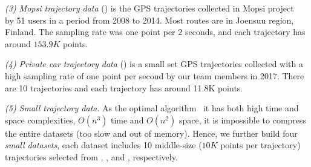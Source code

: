 \vspace{0.5ex}
\ni \emph{(3) Mopsi trajectory data} (\mopsi) is the GPS trajectories collected in Mopsi project~\cite{Mopsi} by 51 users in a period from 2008 to 2014. Most routes are in Joensuu region, Finland.
The sampling rate was one point per $2$ seconds, and each trajectory has around $153.9K$ points.

\vspace{0.5ex}
\ni \emph{(4) Private car trajectory data} (\pricar) is a small set GPS trajectories collected with a high sampling rate of one point per second by our team members in 2017. There are 10 trajectories and each trajectory has around 11.8K points.


\vspace{0.5ex}
\ni \emph{(5) Small trajectory data}. 
As the optimal \lsa algorithm~\cite{Imai:Optimal} it has both high time and space complexities, \ie $O(n^3)$ time and $O(n^2)$ space, it is impossible to compress the entire datasets (too slow and out of memory). Hence, we further build four \textit{small datasets}, each dataset includes 10 middle-size ($10K$ points per trajectory) trajectories selected from \sercar, \geolife, \mopsi and \pricar, respectively.



